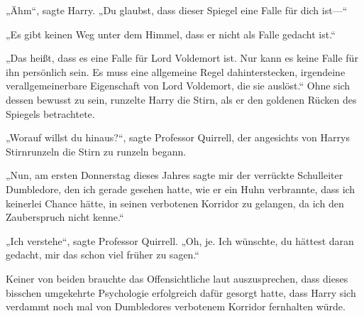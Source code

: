 „Ähm“, sagte Harry. „Du glaubst, dass dieser Spiegel eine Falle für dich ist—“

„Es gibt keinen Weg unter dem Himmel, dass er nicht als Falle gedacht ist.“

„Das heißt, dass es eine Falle für Lord Voldemort ist. Nur kann es keine Falle für ihn persönlich sein. Es muss eine allgemeine Regel dahinterstecken, irgendeine verallgemeinerbare Eigenschaft von Lord Voldemort, die sie auslöst.“
Ohne sich dessen bewusst zu sein, runzelte Harry die Stirn, als er den goldenen Rücken des Spiegels betrachtete.

„Worauf willst du hinaus?“, sagte Professor Quirrell, der angesichts von Harrys Stirnrunzeln die Stirn zu runzeln begann.

„Nun, am ersten Donnerstag dieses Jahres sagte mir der verrückte Schulleiter Dumbledore, den ich gerade gesehen hatte, wie er ein Huhn verbrannte, dass ich keinerlei Chance hätte, in seinen verbotenen Korridor zu gelangen, da ich den Zauberspruch  nicht kenne.“

„Ich verstehe“, sagte Professor Quirrell. „Oh, je. Ich wünschte, du hättest daran gedacht, mir das schon viel früher zu sagen.“

Keiner von beiden brauchte das Offensichtliche laut auszusprechen, dass dieses bisschen umgekehrte Psychologie erfolgreich dafür gesorgt hatte, dass Harry sich verdammt noch mal von Dumbledores verbotenem Korridor fernhalten würde.

